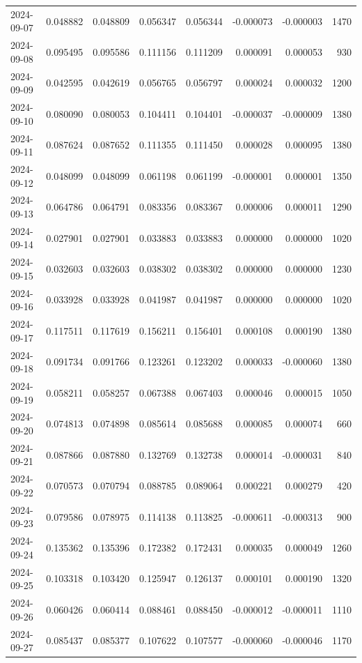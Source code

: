 \begin{tabular}{lrrrrrrr}
2024-09-07 & 0.048882 & 0.048809 & 0.056347 & 0.056344 & -0.000073 & -0.000003 & 1470 \\
2024-09-08 & 0.095495 & 0.095586 & 0.111156 & 0.111209 & 0.000091 & 0.000053 & 930 \\
2024-09-09 & 0.042595 & 0.042619 & 0.056765 & 0.056797 & 0.000024 & 0.000032 & 1200 \\
2024-09-10 & 0.080090 & 0.080053 & 0.104411 & 0.104401 & -0.000037 & -0.000009 & 1380 \\
2024-09-11 & 0.087624 & 0.087652 & 0.111355 & 0.111450 & 0.000028 & 0.000095 & 1380 \\
2024-09-12 & 0.048099 & 0.048099 & 0.061198 & 0.061199 & -0.000001 & 0.000001 & 1350 \\
2024-09-13 & 0.064786 & 0.064791 & 0.083356 & 0.083367 & 0.000006 & 0.000011 & 1290 \\
2024-09-14 & 0.027901 & 0.027901 & 0.033883 & 0.033883 & 0.000000 & 0.000000 & 1020 \\
2024-09-15 & 0.032603 & 0.032603 & 0.038302 & 0.038302 & 0.000000 & 0.000000 & 1230 \\
2024-09-16 & 0.033928 & 0.033928 & 0.041987 & 0.041987 & 0.000000 & 0.000000 & 1020 \\
2024-09-17 & 0.117511 & 0.117619 & 0.156211 & 0.156401 & 0.000108 & 0.000190 & 1380 \\
2024-09-18 & 0.091734 & 0.091766 & 0.123261 & 0.123202 & 0.000033 & -0.000060 & 1380 \\
2024-09-19 & 0.058211 & 0.058257 & 0.067388 & 0.067403 & 0.000046 & 0.000015 & 1050 \\
2024-09-20 & 0.074813 & 0.074898 & 0.085614 & 0.085688 & 0.000085 & 0.000074 & 660 \\
2024-09-21 & 0.087866 & 0.087880 & 0.132769 & 0.132738 & 0.000014 & -0.000031 & 840 \\
2024-09-22 & 0.070573 & 0.070794 & 0.088785 & 0.089064 & 0.000221 & 0.000279 & 420 \\
2024-09-23 & 0.079586 & 0.078975 & 0.114138 & 0.113825 & -0.000611 & -0.000313 & 900 \\
2024-09-24 & 0.135362 & 0.135396 & 0.172382 & 0.172431 & 0.000035 & 0.000049 & 1260 \\
2024-09-25 & 0.103318 & 0.103420 & 0.125947 & 0.126137 & 0.000101 & 0.000190 & 1320 \\
2024-09-26 & 0.060426 & 0.060414 & 0.088461 & 0.088450 & -0.000012 & -0.000011 & 1110 \\
2024-09-27 & 0.085437 & 0.085377 & 0.107622 & 0.107577 & -0.000060 & -0.000046 & 1170 \\

\end{tabular}
